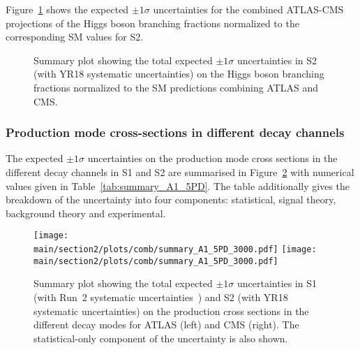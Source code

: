 Figure~\ref{fig:br_comb} shows the expected $\pm 1\sigma$ uncertainties for the combined ATLAS-CMS projections of the Higgs boson branching fractions normalized to the corresponding SM values for S2.

\begin{figure}[hbtp]
\centering
\caption{Summary plot showing the total expected $\pm 1\sigma$ uncertainties in S2  (with YR18 systematic uncertainties) on the Higgs boson branching fractions normalized to the SM predictions combining  ATLAS and CMS.}
\label{fig:br_comb}
\end{figure}



\subsubsection{Production mode cross-sections in different decay channels}
The expected $\pm 1\sigma$ uncertainties on the production mode cross sections in the different decay channels in S1 and S2 are summarised in Figure~\ref{fig:summary_A1_5PD} with numerical values given in Table~\ref{tab:summary_A1_5PD}. The table additionally gives the breakdown of the uncertainty into four components: statistical, signal theory, background theory and experimental. 


\begin{figure}[hbtp]
\centering
\texttt{[image: \\main/section2/plots/comb/summary\_A1\_5PD\_3000.pdf]}%
\texttt{[image: \\main/section2/plots/comb/summary\_A1\_5PD\_3000.pdf]}%
\caption{Summary plot showing the total expected $\pm 1\sigma$ uncertainties in S1 (with Run~2 systematic uncertainties~\cite{Sirunyan:2018koj}) and S2 (with YR18 systematic uncertainties) on the production cross sections in the different decay modes  for ATLAS (left) and CMS (right). The statistical-only component of the uncertainty is also shown.}
\label{fig:summary_A1_5PD}
\end{figure}


\begin{table}[hbtp]
\centering
\caption{The expected $\pm 1\sigma$ uncertainties, expressed as percentages, on the per-production-mode cross sections in the different decay modes  for ATLAS (left) and CMS (right). Values are given for both S1 (with Run~2 systematic uncertainties~\cite{Sirunyan:2018koj}) and S2 (with YR18 systematic uncertainties). The total uncertainty is decomposed into four components: statistical (Stat), signal theory (SigTh), background theory (BkgTh) and experimental (Exp).}
\scriptsize	
\hspace{0.5cm}

\label{tab:summary_A1_5PD}
\vspace{0.5cm}
\end{table}


